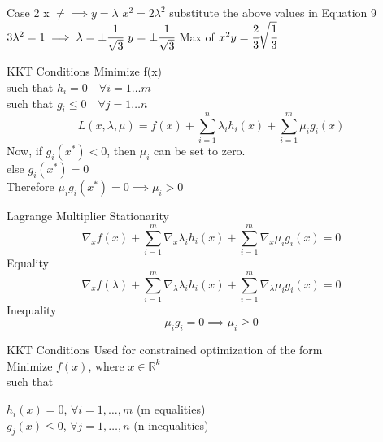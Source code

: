 \documentclass{beamer}
\begin{document}
\begin{frame}{Case 2}
x $\neq  \implies y = \lambda$
\vspace{1em}
$x^{2} = 2\lambda^{2}$ substitute the above values in Equation 9
\vspace{1em}
$3\lambda^{2} = 1 \implies \lambda = \pm \cfrac{1}{\sqrt{3}}$
\vspace{1em}
$y = \pm \cfrac{1}{\sqrt{3}}$
\vspace{1em}
Max of $x^{2}y = \cfrac{2}{3} \sqrt{\cfrac{1}{3}}$
\end{frame}


\begin{frame}{KKT Conditions}
Minimize f(x)\\
such that $h_{i} = 0 \hspace{1em} \forall i = 1 \dots m$\\
such that $g_{i} \leq 0 \hspace{1em} \forall j = 1 \dots n$\\

\begin{equation*}
L(x,\lambda,\mu)= f(x) + \sum_{i=1}^{n}\lambda_{i}h_{i}(x) + 
\sum_{i=1}^{m}\mu_{i}g_{i}(x) 
\end{equation*}
Now, if $g_{i}(x^{*})<0$, then $\mu_{i}$ can be set to zero.\\
else  $g_{i}(x^{*})=0$\\
Therefore $\mu_{i}g_{i}(x^{*})=0 \implies \mu_{i}>0$
\end{frame}


\begin{frame}{Lagrange Multiplier}
Stationarity\\
\begin{equation*}
\nabla_{x}f(x) + \sum_{i=1}^{m} \nabla_{x}\lambda_{i}h_{i}(x)+\sum_{i=1}^{m}\nabla_{x}\mu_{i}g_{i}(x)=0
\end{equation*}
Equality
\begin{equation*}
\nabla_{x}f(\lambda) + \sum_{i=1}^{m} \nabla_{\lambda}\lambda_{i}h_{i}(x)+\sum_{i=1}^{m}\nabla_{\lambda}\mu_{i}g_{i}(x)=0
\end{equation*}
Inequality
\begin{equation*}
\mu_{i}g_{i}=0 \implies \mu_{i} \geq 0
\end{equation*}
\end{frame}


\begin{frame}{KKT Conditions}
	Used for constrained optimization of the form\\
	\vspace{1cm}
	Minimize $f(x)$, where $x \in \mathbb{R}^k$\\
	such that\\
	\begin{center}
		$h_i(x) = 0$,  $\forall i = 1, \dots, m$ (m equalities)\\
		$g_j(x) \leq 0$,  $\forall j = 1, \dots, n$ (n inequalities)\\
	\end{center}
\end{frame}
\end{document}
